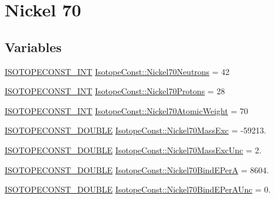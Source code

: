 \hypertarget{group___isotope_const-_nickel-_ni70}{}\section{Nickel 70}
\label{group___isotope_const-_nickel-_ni70}
\subsection*{Variables}
\begin{DoxyCompactItemize}
\item 
\mbox{\hyperlink{group___isotope_const-_macros_ga5f18360b3e99483a35c32d789e62621c}{I\+S\+O\+T\+O\+P\+E\+C\+O\+N\+S\+T\+\_\+\+I\+NT}} \mbox{\hyperlink{group___isotope_const-_nickel-_ni70_ga3b05e7ae000a050abe02a0028ba92b3c}{Isotope\+Const\+::\+Nickel70\+Neutrons}} = 42
\item 
\mbox{\hyperlink{group___isotope_const-_macros_ga5f18360b3e99483a35c32d789e62621c}{I\+S\+O\+T\+O\+P\+E\+C\+O\+N\+S\+T\+\_\+\+I\+NT}} \mbox{\hyperlink{group___isotope_const-_nickel-_ni70_ga5930bb98a7e80379163b256a8f3cf8c3}{Isotope\+Const\+::\+Nickel70\+Protons}} = 28
\item 
\mbox{\hyperlink{group___isotope_const-_macros_ga5f18360b3e99483a35c32d789e62621c}{I\+S\+O\+T\+O\+P\+E\+C\+O\+N\+S\+T\+\_\+\+I\+NT}} \mbox{\hyperlink{group___isotope_const-_nickel-_ni70_ga400085330bec6fdedd4cefe9a4bc436a}{Isotope\+Const\+::\+Nickel70\+Atomic\+Weight}} = 70
\item 
\mbox{\hyperlink{group___isotope_const-_macros_ga8f45a7272ce02c0b4c65c44636ed719a}{I\+S\+O\+T\+O\+P\+E\+C\+O\+N\+S\+T\+\_\+\+D\+O\+U\+B\+LE}} \mbox{\hyperlink{group___isotope_const-_nickel-_ni70_ga5a5ed6764c4f98837bccac672f00ffdb}{Isotope\+Const\+::\+Nickel70\+Mass\+Exc}} = -\/59213.
\item 
\mbox{\hyperlink{group___isotope_const-_macros_ga8f45a7272ce02c0b4c65c44636ed719a}{I\+S\+O\+T\+O\+P\+E\+C\+O\+N\+S\+T\+\_\+\+D\+O\+U\+B\+LE}} \mbox{\hyperlink{group___isotope_const-_nickel-_ni70_gad13b518799f4a65d88c03742f6df8c62}{Isotope\+Const\+::\+Nickel70\+Mass\+Exc\+Unc}} = 2.
\item 
\mbox{\hyperlink{group___isotope_const-_macros_ga8f45a7272ce02c0b4c65c44636ed719a}{I\+S\+O\+T\+O\+P\+E\+C\+O\+N\+S\+T\+\_\+\+D\+O\+U\+B\+LE}} \mbox{\hyperlink{group___isotope_const-_nickel-_ni70_ga033861b9ac9db193e016da6639161a66}{Isotope\+Const\+::\+Nickel70\+Bind\+E\+PerA}} = 8604.
\item 
\mbox{\hyperlink{group___isotope_const-_macros_ga8f45a7272ce02c0b4c65c44636ed719a}{I\+S\+O\+T\+O\+P\+E\+C\+O\+N\+S\+T\+\_\+\+D\+O\+U\+B\+LE}} \mbox{\hyperlink{group___isotope_const-_nickel-_ni70_ga3f1c7c7ffbfd744dfc8565d10533cc43}{Isotope\+Const\+::\+Nickel70\+Bind\+E\+Per\+A\+Unc}} = 0.

\end{DoxyCompactItemize}
